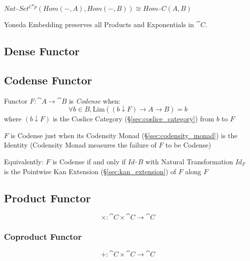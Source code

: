 $Nat_\cat{Set^{C^op}}(Hom(-,A), Hom(-,B)) \cong Hom_\cat{C}(A,B)$

Yoneda Embedding preserves all Products and Exponentials in
$\cat{C}$.



\subsection{Dense Functor}\label{sec:dense_functor}

\subsection{Codense Functor}\label{sec:codense_functor}

Functor $F : \cat{A} \rightarrow \cat{B}$ is \emph{Codense} when:
\[
  \forall b \in B,
  \mathrm{Lim}((b \downarrow F) \rightarrow A \rightarrow B) = b
\]
where $(b \downarrow F)$ is the Coslice Category
(\S\ref{sec:coslice_category}) from $b$ to $F$

$F$ is Codense just when its Codensity Monad
(\S\ref{sec:codensity_monad}) is the Identity (Codensity Monad
measures the failure of $F$ to be Codense)

Equivalently: $F$ is Codense if and only if $Id_\cat{B}$ with Natural
Transformation $Id_F$ is the Pointwise Kan Extension
(\S\ref{sec:kan_extension}) of $F$ along $F$



\subsection{Product Functor}\label{sec:product_functor}

\[
  \times : \cat{C} \times \cat{C} \rightarrow \cat{C}
\]



\subsubsection{Coproduct Functor}\label{sec:coproduct_functor}

\[
  + : \cat{C} \times \cat{C} \rightarrow \cat{C}
\]



